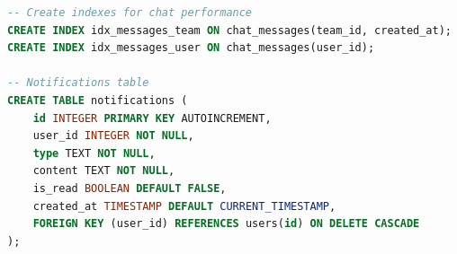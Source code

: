 \documentclass[12pt,a4paper]{article}
\begin{document}
\begin{lstlisting}[language=SQL, caption=Complete SQLite Database Schema]
-- Create indexes for chat performance
CREATE INDEX idx_messages_team ON chat_messages(team_id, created_at);
CREATE INDEX idx_messages_user ON chat_messages(user_id);

-- Notifications table
CREATE TABLE notifications (
    id INTEGER PRIMARY KEY AUTOINCREMENT,
    user_id INTEGER NOT NULL,
    type TEXT NOT NULL,
    content TEXT NOT NULL,
    is_read BOOLEAN DEFAULT FALSE,
    created_at TIMESTAMP DEFAULT CURRENT_TIMESTAMP,
    FOREIGN KEY (user_id) REFERENCES users(id) ON DELETE CASCADE
);
\end{lstlisting}
\end{document}
